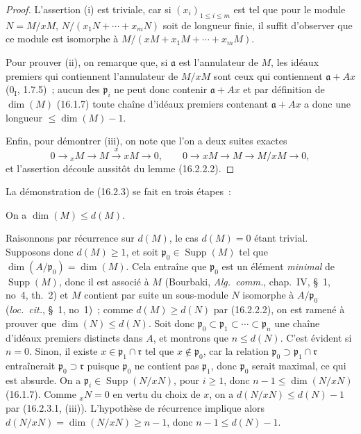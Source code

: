 \begin{proof}
L'assertion (i) est triviale, car si $(x_i)_{1\leq i\leq m}$ est tel que pour
le module $N=M/xM$, $N/(x_1N+\cdots+x_mN)$ soit de longueur finie, il suffit
d'observer que ce module est isomorphe à
$M/(xM+x_1M+\cdots+x_mM)$.

Pour prouver (ii), on remarque que, si $\mathfrak{a}$ est l'annulateur de
$M$, les idéaux premiers qui contiennent l'annulateur de $M/xM$ sont ceux qui
contiennent $\mathfrak{a}+Ax$ ($0_{\mathrm I}$, 1.7.5)~; aucun des
$\mathfrak{p}_i$ ne peut donc contenir $\mathfrak{a}+Ax$ et par définition de
$\dim(M)$ (16.1.7) toute chaîne d'idéaux premiers contenant
$\mathfrak{a}+Ax$ a donc une longueur $\leq\dim(M)-1$.


Enfin, pour démontrer (iii), on note que l'on a deux suites exactes
\[
  0\to{}_xM\to M\xrightarrow{x}xM\to0,\qquad
  0\to xM\to M\to M/xM\to0,
\]
et l'assertion découle aussitôt du lemme (16.2.2.2).
\end{proof}

La démonstration de (16.2.3) se fait en trois étapes~:

\begin{env}[16.2.3.2]
\label{0.16.2.3.2-fr}
On a $\dim(M)\leq d(M)$.
\end{env}

Raisonnons par récurrence sur $d(M)$, le cas $d(M)=0$ étant trivial.
Supposons donc $d(M)\geq1$, et soit $\mathfrak{p}_0\in\operatorname{Supp}(M)$
tel que $\dim(A/\mathfrak{p}_0)=\dim(M)$. Cela entraîne que
$\mathfrak{p}_0$ est un élément \emph{minimal} de $\operatorname{Supp}(M)$,
donc il est associé à $M$ (Bourbaki, \emph{Alg.~comm.}, chap.~IV, \S~1,
no~4, th.~2) et $M$ contient par suite un sous-module $N$ isomorphe à
$A/\mathfrak{p}_0$ (\emph{loc.~cit.}, \S~1, no~1)~; comme $d(M)\geq d(N)$
par (16.2.2.2), on est ramené à prouver que $\dim(N)\leq d(N)$. Soit donc
$\mathfrak{p}_0\subset\mathfrak{p}_1\subset\cdots\subset\mathfrak{p}_n$ une
chaîne d'idéaux premiers distincts dans $A$, et montrons que $n\leq d(N)$.
C'est évident si $n=0$. Sinon, il existe
$x\in\mathfrak{p}_1\cap\mathfrak{r}$ tel que $x\notin\mathfrak{p}_0$, car la
relation $\mathfrak{p}_0\supset\mathfrak{p}_1\cap\mathfrak{r}$ entraînerait
$\mathfrak{p}_0\supset\mathfrak{r}$ puisque $\mathfrak{p}_0$ ne contient pas
$\mathfrak{p}_1$, donc $\mathfrak{p}_0$ serait maximal, ce qui est absurde.
On a $\mathfrak{p}_i\in\operatorname{Supp}(N/xN)$, pour $i\geq1$, donc
$n-1\leq\dim(N/xN)$ (16.1.7). Comme ${}_xN=0$ en vertu du choix de $x$, on a
$d(N/xN)\leq d(N)-1$ par (16.2.3.1, (iii)). L'hypothèse de récurrence implique
alors $d(N/xN)=\dim(N/xN)\geq n-1$, donc $n-1\leq d(N)-1$.

